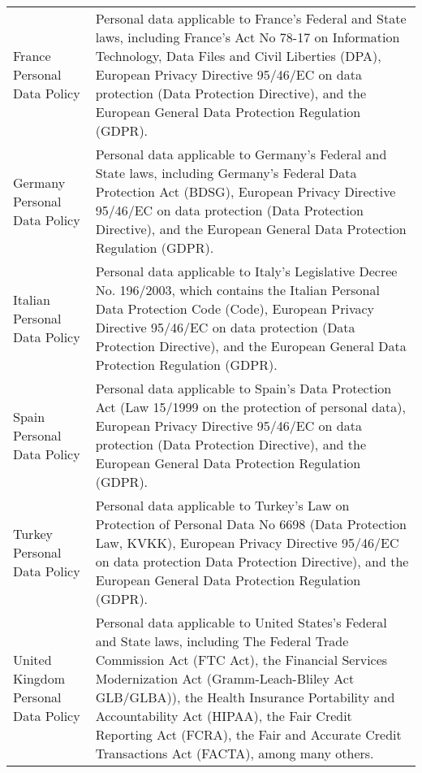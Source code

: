 \documentclass[letterpaper,10pt,english]{sphinxmanual}
\begin{document}


\begin{savenotes}\sphinxattablestart
\centering
\begin{tabulary}{\linewidth}[t]{|T|T|}
\hline
{}\relax &\relax \\
\hline
France Personal Data Policy
&
Personal data applicable to France’s Federal and State laws,
including France’s Act No 78-17 on Information Technology,
Data Files and Civil Liberties (DPA), European Privacy
Directive 95/46/EC on data protection (Data Protection
Directive), and the European General Data Protection
Regulation (GDPR).
\\
\hline
Germany Personal Data Policy
&
Personal data applicable to Germany’s Federal and State laws,
including Germany’s Federal Data Protection Act (BDSG),
European Privacy Directive 95/46/EC on data protection (Data
Protection Directive), and the European General Data
Protection Regulation (GDPR).
\\
\hline
Italian Personal Data Policy
&
Personal data applicable to Italy’s Legislative Decree No.
196/2003, which contains the Italian Personal Data
Protection Code (Code), European Privacy Directive 95/46/EC on
data protection (Data Protection Directive), and the European
General Data Protection Regulation (GDPR).
\\
\hline
Spain Personal Data Policy
&
Personal data applicable to Spain’s Data Protection Act (Law
15/1999 on the protection of personal data), European
Privacy Directive 95/46/EC on data protection (Data
Protection Directive), and the European General Data
Protection Regulation (GDPR).
\\
\hline
Turkey Personal Data Policy
&
Personal data applicable to Turkey’s Law on Protection of
Personal Data No 6698 (Data Protection Law, KVKK),
European Privacy Directive 95/46/EC on data protection
Data Protection Directive), and the European General Data
Protection Regulation (GDPR).
\\
\hline
United Kingdom Personal Data Policy
&
Personal data applicable to United States’s Federal and
State laws, including The Federal Trade Commission Act
(FTC Act), the Financial Services  Modernization Act
(Gramm-Leach-Bliley Act GLB/GLBA)), the Health Insurance
Portability and Accountability Act (HIPAA), the Fair Credit
Reporting Act (FCRA), the Fair and Accurate Credit
Transactions Act (FACTA), among many others.
\\
\hline
\end{tabulary}
\par
\sphinxattableend\end{savenotes}
\end{document}
